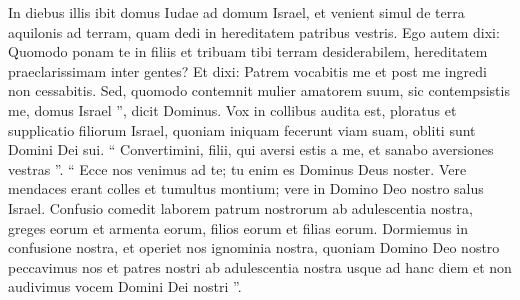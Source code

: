 \begin{biblechapter}
\begin{biblechapter}
\begin{biblechapter}
\verse In diebus illis ibit domus Iudae ad domum Israel, et venient simul de terra aquilonis ad terram, quam dedi in hereditatem patribus vestris.
 \verse Ego autem dixi:
 Quomodo ponam te in filiis
 et tribuam tibi terram desiderabilem,
 hereditatem praeclarissimam inter gentes?
 Et dixi: Patrem vocabitis me
 et post me ingredi non cessabitis.
 \verse Sed, quomodo contemnit mulier amatorem suum,
 sic contempsistis me, domus Israel ”,
 dicit Dominus.
 \verse Vox in collibus audita est,
 ploratus et supplicatio filiorum Israel,
 quoniam iniquam fecerunt viam suam,
 obliti sunt Domini Dei sui.
 \verse “ Convertimini, filii, qui aversi estis a me,
 et sanabo aversiones vestras ”.
 “ Ecce nos venimus ad te;
 tu enim es Dominus Deus noster.
 \verse Vere mendaces erant colles
 et tumultus montium;
 vere in Domino Deo nostro
 salus Israel.
 \verse Confusio comedit laborem patrum nostrorum
 ab adulescentia nostra,
 greges eorum et armenta eorum,
 filios eorum et filias eorum.
 \verse Dormiemus in confusione nostra,
 et operiet nos ignominia nostra,
 quoniam Domino Deo nostro peccavimus
 nos et patres nostri
 ab adulescentia nostra usque ad hanc diem
 et non audivimus vocem Domini Dei nostri ”.
 

\end{biblechapter}
\end{biblechapter}
\end{biblechapter}
